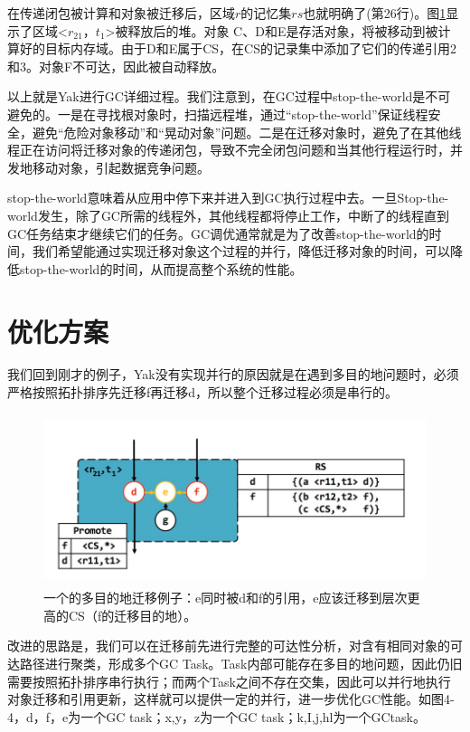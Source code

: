 在传递闭包被计算和对象被迁移后，区域$r$的记忆集$rs$也就明确了(第26行)。图\ref{snapshot}显示了区域<$r_{21}$，$t_1$>被释放后的堆。对象 C、D和E是存活对象，将被移动到被计算好的目标内存域。由于D和E属于CS，在CS的记录集中添加了它们的传递引用2和3。对象F不可达，因此被自动释放。

以上就是Yak进行GC详细过程。我们注意到，在GC过程中stop-the-world是不可避免的。一是在寻找根对象时，扫描远程堆，通过“stop-the-world”保证线程安全，避免“危险对象移动”和“晃动对象”问题。二是在迁移对象时，避免了在其他线程正在访问将迁移对象的传递闭包，导致不完全闭包问题和当其他行程运行时，并发地移动对象，引起数据竞争问题。

stop-the-world意味着从应用中停下来并进入到GC执行过程中去。一旦Stop-the-world发生，除了GC所需的线程外，其他线程都将停止工作，中断了的线程直到GC任务结束才继续它们的任务。GC调优通常就是为了改善stop-the-world的时间，我们希望能通过实现迁移对象这个过程的并行，降低迁移对象的时间，可以降低stop-the-world的时间，从而提高整个系统的性能。


\section{优化方案}

我们回到刚才的例子，Yak没有实现并行的原因就是在遇到多目的地问题时，必须严格按照拓扑排序先迁移f再迁移d，所以整个迁移过程必须是串行的。
\begin{figure}[H]
    \centering
    \includegraphics[width=12cm,height=5cm]{figure/n1.png}
    \caption{
        一个的多目的地迁移例子：e同时被d和f的引用，e应该迁移到层次更高的CS（f的迁移目的地）。
    }
    \label{snapshot}
\end{figure}
改进的思路是，我们可以在迁移前先进行完整的可达性分析，对含有相同对象的可达路径进行聚类，形成多个GC Task。Task内部可能存在多目的地问题，因此仍旧需要按照拓扑排序串行执行；而两个Task之间不存在交集，因此可以并行地执行对象迁移和引用更新，这样就可以提供一定的并行，进一步优化GC性能。如图4-4，d，f，e为一个GC task；x,y，z为一个GC task；k,I,j,hl为一个GCtask。

